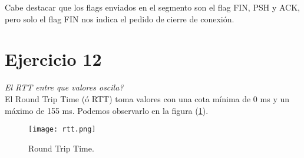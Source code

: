 \documentclass[osajnl,twocolumn,showpacs,superscriptaddress,10pt]{revtex4-1} %
\begin{document}
Cabe destacar que los flags enviados en el segmento son el flag FIN, PSH y ACK, pero solo el flag FIN nos indica el pedido de cierre de conexión. \\

\section{Ejercicio 12}

\textit{El RTT entre que valores oscila?} \\

El Round Trip Time (ó RTT) toma valores con una cota mínima de 0 ms y un máximo de 155 ms. Podemos observarlo en la figura (\ref{rtt}). \\

\begin{figure}[H]
    \centering
    \texttt{[image: rtt.png]}
    \caption{Round Trip Time.}
    \label{rtt}
\end{figure}
\end{document}
